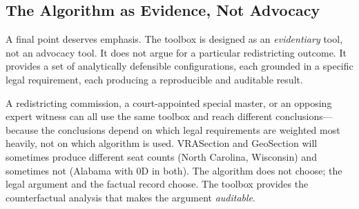 \subsection{The Algorithm as Evidence, Not Advocacy}

A final point deserves emphasis.
The toolbox is designed as an \emph{evidentiary} tool, not an advocacy tool.
It does not argue for a particular redistricting outcome.
It provides a set of analytically defensible configurations, each grounded in
a specific legal requirement, each producing a reproducible and auditable result.

A redistricting commission, a court-appointed special master, or an opposing
expert witness can all use the same toolbox and reach different conclusions---
because the conclusions depend on which legal requirements are weighted most
heavily, not on which algorithm is used.
VRASection and GeoSection will sometimes produce different seat counts (North
Carolina, Wisconsin) and sometimes not (Alabama with $0\mathrm{D}$ in both).
The algorithm does not choose; the legal argument and the factual record choose.
The toolbox provides the counterfactual analysis that makes the argument
\emph{auditable}.

